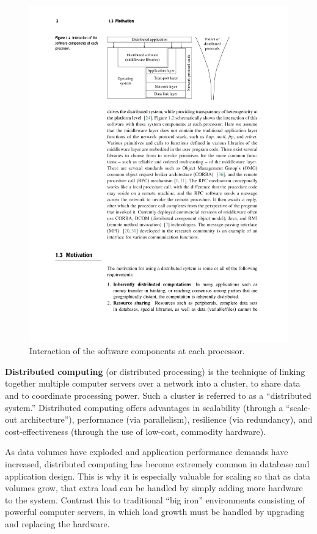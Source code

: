 \documentclass[../report.tex]{subfiles}
\begin{document}
\begin{figure}[h!]
\centering
\includegraphics[width=0.8\linewidth]{figures/processinteraction.pdf}
\caption{Interaction of the software components at each processor. \cite[3]{kshemkalyani2011distributed}}
\label{fig:processinteraction}
\end{figure}

\textbf{Distributed computing} (or distributed processing) is the technique of linking together multiple computer servers over a network into a cluster, to share data and to coordinate processing power. Such a cluster is referred to as a “distributed system.” Distributed computing offers advantages in scalability (through a “scale-out architecture”), performance (via parallelism), resilience (via redundancy), and cost-effectiveness (through the use of low-cost, commodity hardware).

As data volumes have exploded and application performance demands have increased, distributed computing has become extremely common in database and application design. This is why it is especially valuable for scaling so that as data volumes grow, that extra load can be handled by simply adding more hardware to the system. Contrast this to traditional “big iron” environments consisting of powerful computer servers, in which load growth must be handled by upgrading and replacing the hardware.
\end{document}
